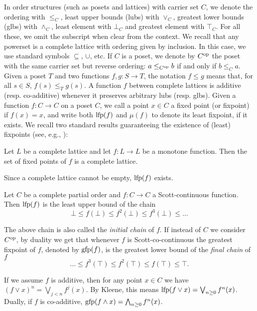 In order structures (such as posets and lattices) with carrier set $C$, we denote the ordering with $\le_C$, least upper bounds (lubs) with $\vee_C$, greatest lower bounds (glbs) with $\wedge_C$, least element with $\bot_C$ and greatest element with $\top_C$. For all these, we omit the subscript when clear from the context.
We recall that any powerset is a complete lattice with ordering given by inclusion. In this case, we use standard symbols $\subseteq$, $\cup$, etc.
If $C$ is a poset, we denote by $C^{\text{op}}$ the poset with the same carrier set but reverse ordering: $a \le_{C^{\text{op}}} b$ if and only if $b \le_C a$.
Given a poset $T$ and two functions $f, g: S \rightarrow T$, the notation $f \le g$ means that, for all $s \in S$, $f(s) \le_T g(s)$.
A function $f$ between complete lattices is additive (resp. co-additive) whenever it preserves arbitrary lubs (resp. glbs).
Given a function $f : C \rightarrow C$ on a poset $C$, we call a point $x \in C$ a fixed point (or fixpoint) if $f(x) = x$, and write both $\text{lfp}(f)$ and $\mu(f)$ to denote its least fixpoint, if it exists. We recall two standard results guaranteeing the existence of (least) fixpoints (see, e.g., \cite{DP02}):
\begin{theorem}\label{th:bg:knaster-tarski}
	Let $L$ be a complete lattice and let $f: L \rightarrow L$ be a monotone function. Then the set of fixed points of $f$ is a complete lattice.
\end{theorem}
\begin{corollary}
	Since a complete lattice cannot be empty, $\text{lfp}(f)$ exists.
\end{corollary}
\begin{theorem}[Kleene]\label{th:bg:kleene}
	Let $C$ be a complete partial order and $f : C \rightarrow C$ a Scott-continuous function. Then $\text{lfp}(f)$ is the least upper bound of the chain
	\[
	\bot \le f(\bot) \le f^2(\bot) \le f^3(\bot) \le \dots
	\]
\end{theorem}

The above chain is also called the \emph{initial chain} of $f$. If instead of $C$ we consider $C^{\text{op}}$, by duality we get that whenever $f$ is Scott-co-continuous the greatest fixpoint of $f$, denoted by $\text{gfp}(f)$, is the greatest lower bound of the \emph{final chain} of $f$
\[
\dots \le f^3(\top) \le f^2(\top) \le f(\top) \le \top  \text{.}
\]

If we assume $f$ is additive, then for any point $x \in C$ we have $(f \lor x)^n = \bigvee_{j < n} f^j(x)$. By Kleene, this means $\text{lfp}(f \lor x) = \bigvee_{n \ge 0} f^n(x)$. Dually, if $f$ is co-additive, $\text{gfp}(f \land x) = \bigwedge_{n \ge 0} f^n(x)$.


